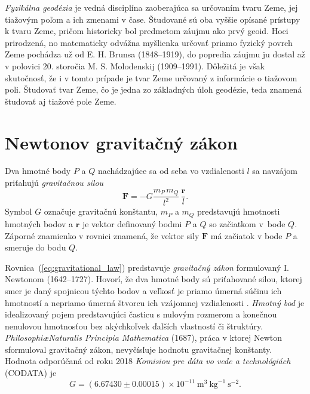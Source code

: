 \documentclass[a4paper, 12pt]{book}
\let\vec\mathbf
\begin{document}
\emph{Fyzikálna geodézia} je vedná disciplína zaoberajúca sa určovaním tvaru 
Zeme, jej tiažovým poľom a ich zmenami v čase.  Študované sú oba vyššie opísané 
prístupy k tvaru Zeme, pričom historicky bol predmetom záujmu ako prvý geoid.  
Hoci prirodzená, no matematicky odvážna myšlienka určovať priamo fyzický povrch 
Zeme pochádza už od E. H. Brunsa (1848--1919), do popredia záujmu ju dostal až 
v polovici 20. storočia M. S. Molodenskij (1909--1991).  Dôležitá je však 
skutočnosť, že i v tomto prípade je tvar Zeme určovaný z informácie o tiažovom 
poli.  Študovať tvar Zeme, čo je jedna zo základných úloh geodézie, teda 
znamená študovať aj tiažové pole Zeme.

\section{Newtonov gravitačný zákon}


Dva hmotné body $P$ a $Q$ nachádzajúce sa od seba vo vzdialenosti $l$ sa 
navzájom priťahujú \emph{gravitačnou silou}
%
\begin{equation}
\label{eq:gravitational_law}
\vec F = -G \frac{m_P \, m_Q}{l^2} \, \frac{\vec r}{l}{.}
\end{equation}
%
Symbol $G$ označuje gravitačnú konštantu, $m_P$ a $m_Q$ predstavujú hmotnosti 
hmotných bodov a $\vec r$ je vektor definovaný bodmi $P$ a $Q$ so začiatkom 
v~bode $Q$.  Záporné znamienko v rovnici znamená, že vektor sily $\vec F$ má 
začiatok v bode $P$ a smeruje do bodu $Q$.

Rovnica~(\ref{eq:gravitational_law}) predstavuje \emph{gravitačný zákon} 
formulovaný I. Newtonom (1642--1727).  Hovorí, že dva hmotné body sú 
priťahované silou, ktorej smer je daný spojnicou týchto bodov a veľkosť je 
priamo úmerná súčinu ich hmotností a nepriamo úmerná štvorcu ich vzájomnej 
vzdialenosti \citep{Kellogg1967}.  \emph{Hmotný bod} je idealizovaný pojem 
predstavujúci časticu s nulovým rozmerom a konečnou nenulovou hmotnosťou bez 
akýchkoľvek ďalších vlastností či štruktúry.  \emph{Philosophi\ae Naturalis 
Principia Mathematica} (1687), práca v ktorej Newton sformuloval gravitačný 
zákon, nevyčísľuje hodnotu gravitačnej konštanty.  Hodnota odporúčaná od roku 
2018 \emph{Komisiou pre dáta vo vede a technológiách} (CODATA) je
%
\begin{equation}
G = (6.67430 \pm 0.00015) \times 10^{-11} \ \mathrm{m}^3 \ \mathrm{kg}^{-1} 
\ \mathrm{s}^{-2}{.}
\end{equation}
\end{document}
